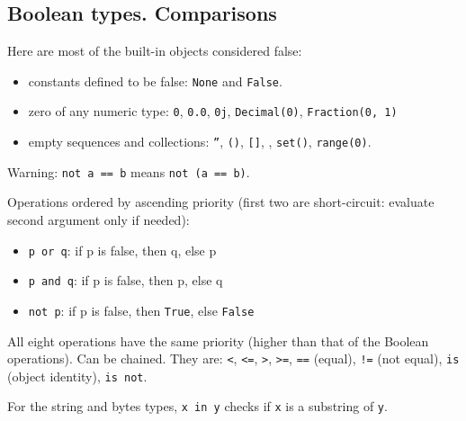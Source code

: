 \subsection{Boolean types. Comparisons}
Here are most of the built-in objects considered false:
\begin{itemize}
\item constants defined to be false: \texttt{None} and \texttt{False}.
\item zero of any numeric type: \texttt{0}, \texttt{0.0}, \texttt{0j}, \texttt{Decimal(0)}, \texttt{Fraction(0, 1)}
\item empty sequences and collections: \texttt{''}, \texttt{()}, \texttt{[]}, \texttt{{}}, \texttt{set()}, \texttt{range(0)}.
\end{itemize}

Warning: \texttt{not a == b} means \texttt{not (a == b)}.

Operations ordered by ascending priority (first two are short-circuit: evaluate second argument only if needed):
\begin{itemize}
	\item \texttt{p or q}: if p is false, then q, else p
	\item \texttt{p and q}: if p is false, then p, else q
	\item \texttt{not p}: if p is false, then \texttt{True}, else \texttt{False}
\end{itemize}

All eight operations have the same priority (higher than that of the Boolean operations).
Can be chained.
They are:
\texttt{<},
\texttt{<=},
\texttt{>},
\texttt{>=},
\texttt{==} (equal),
\texttt{!=} (not equal),
\texttt{is} (object identity),
\texttt{is not}.

For the string and bytes types, \texttt{x in y} checks if \texttt{x} is a substring of \texttt{y}.

%